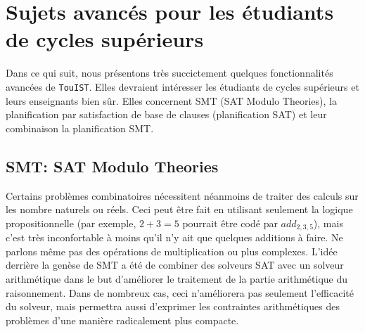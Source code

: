 \documentclass{iaf}
\newcommand{\nameTool}{{\sc \texttt {TouIST}}}
\begin{document}






%
%
%

\section{Sujets avanc\'es pour les \'etudiants de cycles sup\'erieurs}\label{sec:advanced_topics}


Dans ce qui suit, nous pr\'esentons tr\`es succictement quelques fonctionnalit\'es avanc\'ees de \nameTool. Elles devraient int\'eresser les \'etudiants de cycles sup\'erieurs et leurs enseignants bien s\^ur. Elles concernent SMT (SAT Modulo Theories), la planification par satisfaction de base de clauses (planification SAT) et leur combinaison la planification SMT.


\subsection{SMT: SAT Modulo Theories}

Certains probl\`emes combinatoires n\'ecessitent n\'eanmoins de traiter des calculs sur les nombre naturels ou r\'eels. Ceci peut \^etre fait en utilisant seulement la logique propositionnelle (par exemple, $2+3=5$ pourrait \^etre cod\'e par $add_{2,3,5}$), mais c'est tr\`es inconfortable \`a moins qu'il n'y ait que quelques additions \`a faire. Ne parlons m\^eme pas des op\'erations de multiplication ou plus complexes. L'id\'ee derri\`ere la gen\`ese de SMT a \'et\'e de combiner des solveurs SAT avec un solveur arithm\'etique dans le but d'am\'eliorer le traitement de la partie arithm\'etique du raisonnement. Dans de nombreux cas, ceci n'am\'eliorera pas seulement l'efficacit\'e du solveur, mais permettra aussi d'exprimer les contraintes arithm\'etiques des probl\`emes d'une mani\`ere radicalement plus compacte.
\end{document}
